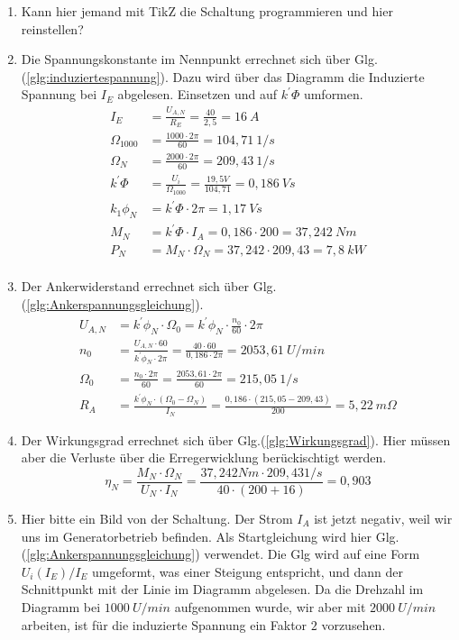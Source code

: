 \begin{solution}
\begin{enumerate}
\item Kann hier jemand mit TikZ die Schaltung programmieren und hier reinstellen?
\item Die Spannungskonstante im Nennpunkt errechnet sich über Glg.(\ref{glg:induziertespannung}). Dazu wird über das Diagramm die Induzierte Spannung bei $I_E$ abgelesen. Einsetzen und auf $k^{'}\Phi$ umformen.
\begin{align}
I_E &= \frac{U_{A,N}}{R_E}=\frac{40}{2,5} = 16~A\\
\Omega_{1000}&= \frac{1000 \cdot 2 \pi}{60} = 104,71~ 1/s\\
\Omega_N&= \frac{2000 \cdot 2 \pi}{60} = 209,43~ 1/s\\
k^{'}\Phi &= \frac{U_i}{\Omega_{1000}} = \frac{19,5V}{104,71}=0,186 ~Vs\\
k_1 \phi_N &= k^{'}\Phi \cdot 2 \pi = 1,17~Vs\\
M_N&=k^{'}\Phi \cdot I_A =0,186 \cdot 200 = 37,242 ~Nm \\
P_N &= M_N \cdot \Omega_N = 37,242 \cdot 209,43 = 7,8 ~kW\\
\end{align}
\item Der Ankerwiderstand errechnet sich über Glg.(\ref{glg:Ankerspannungsgleichung}).
\begin{align}
U_{A,N} & = k^{'}\phi_N \cdot \Omega_0 = k^{'}\phi_N \cdot \frac{n_0}{60} \cdot 2 \pi \\
n_0 & = \frac{U_{A,N} \cdot 60}{k^{'}\phi_N \cdot 2 \pi} = \frac{40 \cdot 60}{0,186 \cdot 2 \pi} = 2053,61 ~U/min\\
\Omega_0 &= \frac{n_0 \cdot 2 \pi}{60} = \frac{2053,61 \cdot 2 \pi}{60}=215,05~1/s\\
R_A &= \frac{k^{'}\phi_N \cdot (\Omega_0 -\Omega_N)}{I_N} =\frac{0,186 \cdot (215,05 -209,43)}{200} = 5,22~m\Omega
\end{align}
\item Der Wirkungsgrad errechnet sich über Glg.(\ref{glg:Wirkungsgrad}). Hier müssen aber die Verluste über die Erregerwicklung berückischtigt werden.
\begin{equation}
\eta_N = \frac{M_N \cdot \Omega_N}{U_N \cdot I_N} = \frac{37,242 Nm \cdot 209,43 1/s}{40 \cdot (200 + 16)}=0,903
\end{equation}
\item Hier bitte ein Bild von der Schaltung. Der Strom $I_A$ ist jetzt negativ, weil wir uns im Generatorbetrieb befinden. Als Startgleichung wird hier Glg.(\ref{glg:Ankerspannungsgleichung}) verwendet. Die Glg wird auf eine Form $U_i(I_E)/I_E$ umgeformt, was einer Steigung entspricht, und dann der Schnittpunkt mit der Linie im Diagramm abgelesen. Da die Drehzahl im Diagramm bei $1000 ~U/min$ aufgenommen wurde, wir aber mit $2000~U/min$ arbeiten, ist f\"ur die induzierte Spannung ein Faktor $2$ vorzusehen.

\end{enumerate}
\end{solution}
